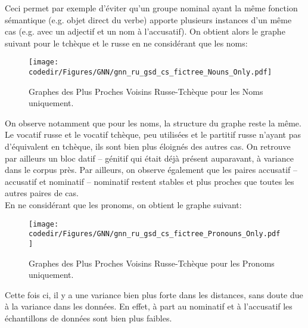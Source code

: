     Ceci permet par exemple d'éviter qu'un groupe nominal ayant la même fonction sémantique (e.g. objet direct du verbe) apporte plusieurs instances d'un même cas (e.g. avec un adjectif et un nom à l'accusatif).
    On obtient alors le graphe suivant pour le tchèque et le russe en ne considérant que les noms:
    \begin{figure}[H]
	    \centering
	    \texttt{[image: \\codedir/Figures/GNN/gnn\_ru\_gsd\_cs\_fictree\_Nouns\_Only.pdf]}
	    \caption{Graphes des Plus Proches Voisins Russe-Tchèque pour les Noms uniquement.}
    \end{figure}
    On observe notamment que pour les noms, la structure du graphe reste la même.
    Le vocatif russe et le vocatif tchèque, peu utilisées et le partitif russe n'ayant pas d'équivalent en tchèque, ils sont bien plus éloignés des autres cas.
    On retrouve par ailleurs un bloc datif -- génitif qui était déjà présent auparavant, à variance dans le corpus près.
    Par ailleurs, on observe également que les paires accusatif -- accusatif et nominatif -- nominatif restent stables et plus proches que toutes les autres paires de cas.\\
    En ne considérant que les pronoms, on obtient le graphe suivant:
    \begin{figure}[H]
	    \centering
	    \texttt{[image: \\codedir/Figures/GNN/gnn\_ru\_gsd\_cs\_fictree\_Pronouns\_Only.pdf]}
	    \caption{Graphes des Plus Proches Voisins Russe-Tchèque pour les Pronoms uniquement.}
    \end{figure}
    Cette fois ci, il y a une variance bien plus forte dans les distances, sans doute due à la variance dans les données. En effet, à part au nominatif et à l'accusatif les échantillons de données sont bien plus faibles.
